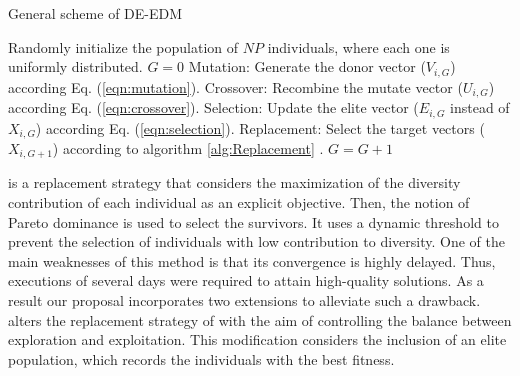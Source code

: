 \begin{algorithm}[H]
  \scriptsize
	\caption{General scheme of DE-EDM} 
	\begin{algorithmic}[1]
	\STATE Randomly initialize the population of $NP$ individuals, where each one is uniformly distributed.
	\STATE $G=0$
		\STATE Mutation: Generate the donor vector ($V_{i,G}$) according Eq. (\ref{eqn:mutation}).
		\STATE Crossover: Recombine the mutate vector ($U_{i,G}$) according Eq. (\ref{eqn:crossover}).
		\STATE Selection: Update the elite vector ($E_{i,G}$ instead of $X_{i,G}$) according Eq. (\ref{eqn:selection}).
		\STATE Replacement: Select the target vectors ($X_{i,G+1}$) according to algorithm \ref{alg:Replacement} .
	   \ENDFOR
	   \STATE $G=G+1$
	\ENDWHILE
    \label{alg:Fase_Remplazo_VSD-MOEAD}
\end{algorithmic}
\end{algorithm}



\RMDDC{} is a replacement strategy that considers the maximization of the diversity 
contribution of each individual as an explicit objective.
%
Then, the notion of Pareto dominance is used to select the survivors.
%
It uses a dynamic threshold to prevent the selection of individuals with low contribution to diversity.
%
One of the main weaknesses of this method is that its convergence is highly delayed.
%
Thus, executions of several days were required to attain high-quality solutions.
%
As a result our proposal incorporates two extensions to alleviate such a drawback.
%
\DEEDM{} alters the replacement strategy of \DE{} with the aim of controlling the 
balance between exploration and exploitation.
%
This modification considers the inclusion of an elite population, which records the individuals with the best fitness.
%

